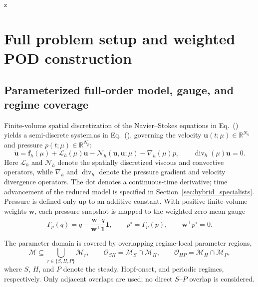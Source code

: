 z





\section{Full problem setup and weighted POD construction}
\label{app:problem_pod}

\subsection{Parameterized full-order model, gauge, and regime coverage}

Finite-volume spatial discretization of the Navier--Stokes equations in Eq.~()  yields a semi-discrete system,as  in Eq.~(),   governing the velocity
$\bm u(t;\mu)\in\mathbb R^{N_u}$ and pressure
$p(t;\mu)\in\mathbb R^{N_p}$:
\begin{equation}
    \dot{\bm u}
    =
    \bm f_h(\mu)
    +\mathcal L_h(\mu)\bm u
    -\mathcal N_h(\bm u,\bm u;\mu)
    -\nabla_h(\mu)p,
    \qquad
    \operatorname{div}_h(\mu)\bm u=0.
    \label{eq:app_fom}
\end{equation}
Here $\mathcal L_h$ and $\mathcal N_h$ denote the spatially discretized viscous and convective operators, while $\nabla_h$ and $\operatorname{div}_h$ denote the pressure gradient and velocity divergence operators. The dot denotes a continuous-time derivative; time advancement of the reduced model is specified in Section~\ref{sec:hybrid_specialists}.
Pressure is defined only up to an additive constant. With positive finite-volume weights $\bm w$, each pressure snapshot is mapped to the weighted zero-mean gauge
\begin{equation}
    \Gamma_p(q)
    =
    q-\frac{\bm w^\top q}{\bm w^\top\bm 1}\bm 1,
    \qquad
    p^\circ=\Gamma_p(p),
    \qquad
    \bm w^\top p^\circ=0.
    \label{eq:app_pressure_gauge}
\end{equation}

The parameter domain is covered by overlapping regime-local parameter regions,
\begin{equation}
    \mathcal M
    \subseteq
    \bigcup_{r\in\{S,H,P\}}\mathcal M_r,
    \qquad
    \mathcal O_{SH}
    =
    \mathcal M_S\cap\mathcal M_H,
    \qquad
    \mathcal O_{HP}
    =
    \mathcal M_H\cap\mathcal M_P,
    \label{eq:app_regime_cover}
\end{equation}
where $S$, $H$, and $P$ denote the steady, Hopf-onset, and periodic regimes, respectively. Only adjacent overlaps are used; no direct $S$--$P$ overlap is considered.


